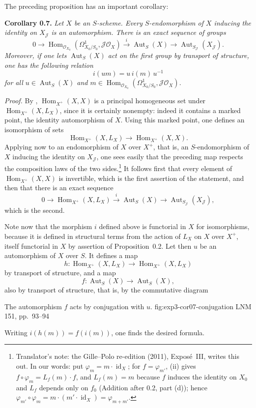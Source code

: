 The preceding proposition has an important corollary:

\medskip
\noindent{}\textbf{Corollary 0.7.}
\textit{Let \(X\) be an \(S\)-scheme. Every \(S\)-endomorphism of \(X\)
inducing the identity on \(X_{\mathscr J}\) is an automorphism. There is an
exact sequence of groups}
\[
 0\longrightarrow
 \operatorname{Hom}_{\mathscr O_{X_0}}
   (\Omega^1_{X_0/S_0},\mathscr J\mathscr O_X)
 \xrightarrow{\ i\ }
 \operatorname{Aut}_S(X)
 \longrightarrow
 \operatorname{Aut}_{S_{\mathscr J}}(X_{\mathscr J}).
\]
\textit{Moreover, if one lets \(\operatorname{Aut}_S(X)\) act on the first
group by transport of structure, one has the following relation}
\[
 i(um)=u\,i(m)\,u^{-1}
\]
\textit{for all \(u\in\operatorname{Aut}_S(X)\) and
\(m\in\operatorname{Hom}_{\mathscr O_{X_0}}
(\Omega^1_{X_0/S_0},\mathscr J\mathscr O_X)\).}

\noindent\textit{Proof.}
By , \(\operatorname{Hom}_{X^+}(X,X)\) is a principal
homogeneous set under \(\operatorname{Hom}_{X^+}(X,L_X)\), since it is
certainly nonempty: indeed it contains a marked point, the identity
automorphism of \(X\). Using this marked point, one defines an isomorphism
of sets
\[
 \operatorname{Hom}_{X^+}(X,L_X)\longrightarrow\operatorname{Hom}_{X^+}(X,X).
\]
Applying now  to an endomorphism of \(X\) over \(X^+\), that is,
an \(S\)-endomorphism of \(X\) inducing the identity on \(X_{\mathscr J}\),
one sees easily that the preceding map respects the composition laws of the
two sides.\footnote{Translator's note: the Gille--Polo re-edition (2011), Exposé~III, writes this out. In our words: put
\(\varphi_m=m\cdot\operatorname{id}_X\); for \(f=\varphi_{m'}\), (ii) gives
\(f\circ\varphi_m=L_f(m)\cdot f\), and \(L_f(m)=m\) because \(f\) induces
the identity on \(X_0\) and \(L_f\) depends only on \(f_0\) (Addition after
0.2, part (d)); hence
\(\varphi_{m'}\circ\varphi_m=m\cdot(m'\cdot\operatorname{id}_X)
=\varphi_{m+m'}\).} It follows first that every element of
\(\operatorname{Hom}_{X^+}(X,X)\) is invertible, which is the first assertion
of the statement, and then that there is an exact sequence
\[
 0\longrightarrow \operatorname{Hom}_{X^+}(X,L_X)
 \xrightarrow{\ i\ }\operatorname{Aut}_S(X)
 \longrightarrow\operatorname{Aut}_{S_{\mathscr J}}(X_{\mathscr J}),
\]
which is the second.

Note now that the morphism \(i\) defined above is functorial in \(X\)
for isomorphisms, because it is defined in structural terms from the action
of \(L_X\) on \(X\) over \(X^+\), itself functorial in \(X\) by assertion
 of Proposition~0.2. Let then \(u\) be an automorphism of \(X\)
over \(S\). It defines a map
\[
 h:\operatorname{Hom}_{X^+}(X,L_X)\longrightarrow\operatorname{Hom}_{X^+}(X,L_X)
\]
by transport of structure, and a map
\[
 f:\operatorname{Aut}_S(X)\longrightarrow\operatorname{Aut}_S(X),
\]
also by transport of structure, that is, by the commutative diagram

  {The automorphism \(f\) acts by conjugation with \(u\).}
  {fig:exp3-cor07-conjugation}
  {LNM 151, pp.~93--94}

Writing \(i(h(m))=f(i(m))\), one finds the desired formula.

